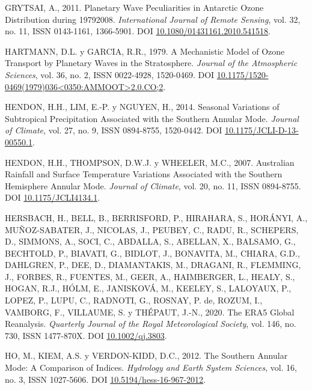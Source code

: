 \documentclass[12pt,oneside,a4paper]{reedthesis}
\newlength{\cslhangindent}
\newenvironment{CSLReferences}[2] %
 {%
  \setlength{\parindent}{0pt}
  \ifodd #1 \everypar{\setlength{\hangindent}{\cslhangindent}}\ignorespaces\fi
  \ifnum #2 > 0
  \setlength{\parskip}{#2\baselineskip}
  \fi
 }%
 {}
\begin{document}
\begin{CSLReferences}{1}{0}
\leavevmode{}%
GRYTSAI, A., 2011. Planetary Wave Peculiarities in {Antarctic} Ozone Distribution during 1979{\textendash}2008. \emph{International Journal of Remote Sensing}, vol. 32, no. 11, ISSN 0143-1161, 1366-5901. DOI \href{https://doi.org/10.1080/01431161.2010.541518}{10.1080/01431161.2010.541518}.

\leavevmode{}%
HARTMANN, D.L. y GARCIA, R.R., 1979. A {Mechanistic Model} of {Ozone Transport} by {Planetary Waves} in the {Stratosphere}. \emph{Journal of the Atmospheric Sciences}, vol. 36, no. 2, ISSN 0022-4928, 1520-0469. DOI \href{https://doi.org/10.1175/1520-0469(1979)036\%3C0350:AMMOOT\%3E2.0.CO;2}{10.1175/1520-0469(1979)036\textless0350:AMMOOT\textgreater2.0.CO;2}.

\leavevmode{}%
HENDON, H.H., LIM, E.-P. y NGUYEN, H., 2014. Seasonal {Variations} of {Subtropical Precipitation Associated} with the {Southern Annular Mode}. \emph{Journal of Climate}, vol. 27, no. 9, ISSN 0894-8755, 1520-0442. DOI \href{https://doi.org/10.1175/JCLI-D-13-00550.1}{10.1175/JCLI-D-13-00550.1}.

\leavevmode{}%
HENDON, H.H., THOMPSON, D.W.J. y WHEELER, M.C., 2007. Australian {Rainfall} and {Surface Temperature Variations Associated} with the {Southern Hemisphere Annular Mode}. \emph{Journal of Climate}, vol. 20, no. 11, ISSN 0894-8755. DOI \href{https://doi.org/10.1175/JCLI4134.1}{10.1175/JCLI4134.1}.

\leavevmode{}%
HERSBACH, H., BELL, B., BERRISFORD, P., HIRAHARA, S., HORÁNYI, A., MUÑOZ-SABATER, J., NICOLAS, J., PEUBEY, C., RADU, R., SCHEPERS, D., SIMMONS, A., SOCI, C., ABDALLA, S., ABELLAN, X., BALSAMO, G., BECHTOLD, P., BIAVATI, G., BIDLOT, J., BONAVITA, M., CHIARA, G.D., DAHLGREN, P., DEE, D., DIAMANTAKIS, M., DRAGANI, R., FLEMMING, J., FORBES, R., FUENTES, M., GEER, A., HAIMBERGER, L., HEALY, S., HOGAN, R.J., HÓLM, E., JANISKOVÁ, M., KEELEY, S., LALOYAUX, P., LOPEZ, P., LUPU, C., RADNOTI, G., ROSNAY, P. de, ROZUM, I., VAMBORG, F., VILLAUME, S. y THÉPAUT, J.-N., 2020. The {ERA5} Global Reanalysis. \emph{Quarterly Journal of the Royal Meteorological Society}, vol. 146, no. 730, ISSN 1477-870X. DOI \href{https://doi.org/10.1002/qj.3803}{10.1002/qj.3803}.

\leavevmode{}%
HO, M., KIEM, A.S. y VERDON-KIDD, D.C., 2012. The {Southern Annular Mode}: A Comparison of Indices. \emph{Hydrology and Earth System Sciences}, vol. 16, no. 3, ISSN 1027-5606. DOI \href{https://doi.org/10.5194/hess-16-967-2012}{10.5194/hess-16-967-2012}.


\end{CSLReferences}
\end{document}
